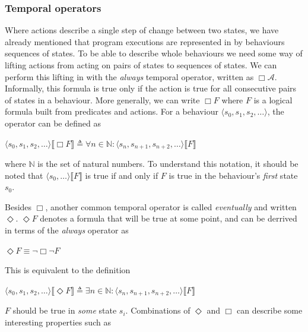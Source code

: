 \documentclass[english, biblatex, digitaloutput]{kththesis}
\begin{document}
\subsubsection{Temporal operators}

Where actions describe a single step of change between two states, we have already mentioned that program executions are represented in  by behaviours \ie sequences of states. To be able to describe whole behaviours we need some way of lifting actions from acting on pairs of states to sequences of states. We can perform this lifting in  with the \textit{always} temporal operator, written as $\Box \mathcal{A}$. Informally, this formula is true only if the action is true for all consecutive pairs of states in a behaviour. More generally, we can write $\Box F$ where $F$ is a logical formula built from predicates and actions. For a behaviour $\langle s_0, s_1, s_2, \dotsc \rangle$, the operator can be defined as

\begin{math}
	\langle s_0, s_1, s_2, \dotsc \rangle \llbracket \Box F \rrbracket \triangleq \forall n \in \mathbb{N} : \langle s_n, s_{n+1}, s_{n+2}, \dotsc \rangle \llbracket F \rrbracket
\end{math}

where $\mathbb{N}$ is the set of natural numbers. To understand this notation, it should be noted that $\langle s_0, \dotsc \rangle \llbracket F \rrbracket$ is true if and only if $F$ is true in the behaviour's \textit{first} state $s_0$.

Besides $\Box$, another common temporal operator is called \textit{eventually} and written $\Diamond$. $\Diamond F$ denotes a formula that will be true at some point, and can be derrived in terms of the \textit{always} operator as

\begin{math}
	\Diamond F \equiv \neg \Box \neg F
\end{math}

This is equivalent to the definition

\begin{math}
	\langle s_0, s_1, s_2, \dotsc \rangle \llbracket \Diamond F \rrbracket \triangleq \exists n \in \mathbb{N} : \langle s_n, s_{n+1}, s_{n+2}, \dotsc \rangle \llbracket F \rrbracket
\end{math}

\ie $F$ should be true in \textit{some} state $s_i$. Combinations of $\Diamond$ and $\Box$ can describe some interesting properties such as
\end{document}
